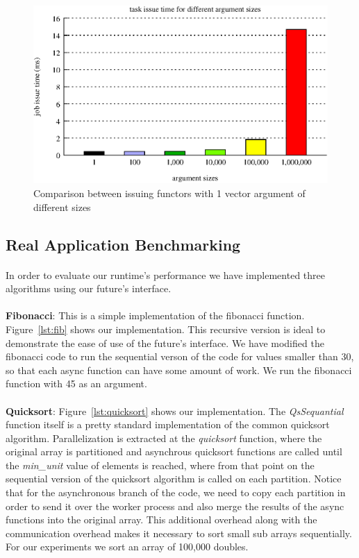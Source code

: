 \begin{figure}[!ht]
\includegraphics[width=0.7\columnwidth]{figures/job_issue_time_different_argsizes}
\caption{Comparison between issuing functors with 1 vector argument of different sizes}
\label{fig:job_issue_time_different_argsizes}
\end{figure}

\subsection{Real Application Benchmarking}
\label{sect:real_app}
\paragraph{}
	In order to evaluate our runtime's performance we have implemented three algorithms using our future's interface.

\paragraph{}
	\textbf{Fibonacci}:  This is a simple implementation of the fibonacci function.  Figure~\ref{lst:fib} shows 
our implementation.  This recursive version is ideal to demonstrate the ease of use of the future's interface.
We have modified the fibonacci code to run the sequential verson of the code for values smaller than  30, so that
each async function can have some amount of work.  We run the fibonacci function with 45 as an argument.  

\paragraph{}
	\textbf{Quicksort}:  Figure~\ref{lst:quicksort} shows our implementation.  The \emph{QsSequantial} 
function itself is a pretty standard
implementation of the common quicksort algorithm.  Parallelization is extracted at the \emph{quicksort} function, where the 
original array is partitioned and asynchrous quicksort functions are called until the \emph{min\_unit} value of elements
is reached, where from that point on the sequential version of the quicksort algorithm is called on each partition.
Notice that for the asynchronous branch of the code, we need to copy each partition in order to send it over the worker 
process and also merge the results of the async functions into the original array.  This additional overhead along with 
the communication overhead makes it necessary to sort small sub arrays sequentially.  For our experiments we sort an 
array of 100,000 doubles. 

